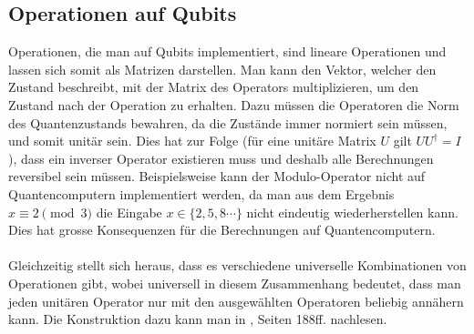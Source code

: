 \paragraph{}
{
\centering
{}
}

\subsection{Operationen auf Qubits}
Operationen, die man auf Qubits implementiert, sind lineare Operationen und lassen sich somit als Matrizen darstellen. Man kann den Vektor, welcher den Zustand beschreibt, mit der Matrix des Operators multiplizieren, um den Zustand nach der Operation zu erhalten. Dazu müssen die Operatoren die Norm des Quantenzustands bewahren, da die Zustände immer normiert sein müssen, und somit unitär sein. Dies hat zur Folge (für eine unitäre Matrix $U$ gilt $UU^{\dagger} = I$), dass ein inverser Operator existieren muss und deshalb alle Berechnungen reversibel sein müssen. Beispielsweise kann der Modulo-Operator nicht auf Quantencomputern implementiert werden, da man aus dem Ergebnis $x \equiv 2 \pmod{3}$ die Eingabe $x \in \{2, 5, 8\cdots\}$ nicht eindeutig wiederherstellen kann. Dies hat grosse Konsequenzen für die Berechnungen auf Quantencomputern.
\paragraph{}
Gleichzeitig stellt sich heraus, dass es verschiedene universelle Kombinationen von Operationen gibt, wobei universell in diesem Zusammenhang bedeutet, dass man jeden unitären Operator nur mit den ausgewählten Operatoren beliebig annähern kann. Die Konstruktion dazu kann man in \cite{QC}, Seiten 188ff. nachlesen.

